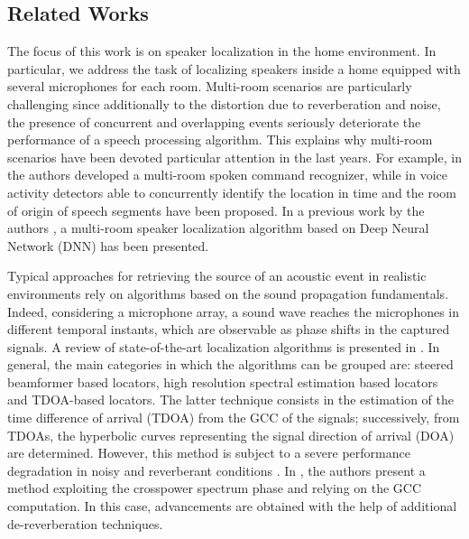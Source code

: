 \documentclass[review]{elsarticle}
\begin{document}
\subsection{Related Works}
The focus of this work is on speaker localization in the home environment. In particular, we address the task of localizing speakers inside a home equipped with several microphones for each room. Multi-room scenarios are particularly challenging since additionally to the distortion due to  reverberation and noise, the presence of concurrent and overlapping events seriously deteriorate the performance of a speech processing algorithm. This explains why multi-room scenarios have been devoted  particular attention in the last years.  For example, in \cite{Rodomagoulakis2017} the authors developed a multi-room spoken command recognizer, while in \cite{ijcnn-vad,vesperini2016deep,Giannoulis2015,Katsamanis2014} voice activity detectors able to concurrently identify the location in time and the room of origin of speech segments have been proposed. In a previous work by the authors \cite{vesperini2016sloc}, a multi-room speaker localization algorithm based on Deep Neural Network (DNN) has been presented.

Typical approaches for retrieving the source of an acoustic event in realistic environments rely on algorithms based on the 
sound propagation fundamentals. Indeed, considering a microphone array, a sound wave reaches the microphones in different temporal instants, which are observable as phase shifts in the captured signals.  A review of state-of-the-art localization algorithms is presented in \cite{kundu2014acoustic}. In general, the main categories in which the algorithms can be grouped are: steered beamformer based locators, high resolution spectral estimation based locators and TDOA-based locators. The latter technique consists in the estimation of the time difference of arrival (TDOA) from the GCC of the signals; successively, from TDOAs, the hyperbolic curves representing the signal direction of arrival (DOA) are determined. However, this method is subject to a severe performance degradation in noisy and reverberant conditions \cite{champagne1996performance}. In \cite{tsiami2014experiments}, the authors present a method exploiting the crosspower spectrum phase and relying on the GCC computation. In this case, advancements are obtained with the help of additional de-reverberation techniques.
\end{document}
